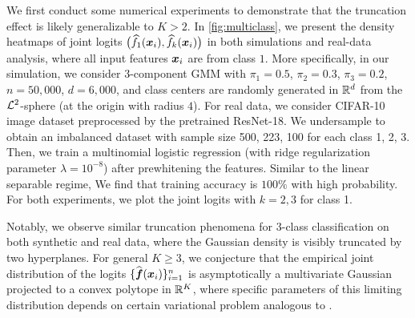 
We first conduct some numerical experiments to demonstrate that the truncation effect is likely generalizable to $K > 2$. In \cref{fig:multiclass}, we present the density heatmaps of joint logits $\bigl(\widehat f_{1}(\text{\boldmath $x$}_i), \widehat f_{k}(\text{\boldmath $x$}_i)\bigr)$ in both simulations and real-data analysis, where all input features $\text{\boldmath $x$}_i$ are from class $1$. More specifically, in our simulation, we consider 3-component GMM with $\pi_1 = 0.5$, $\pi_2 = 0.3$, $\pi_3 = 0.2$, $n=50,000$, $d=6,000$, and class centers are randomly generated in $\mathbb{R}^d$ from the $\mathcal{L}^2$-sphere (at the origin with radius $4$). 
For real data, we consider CIFAR-10 image dataset preprocessed by the pretrained ResNet-18. We undersample to obtain an imbalanced dataset with sample size 500, 223, 100 for each class 1, 2, 3. 
Then, we train a multinomial logistic regression (with ridge regularization parameter $\lambda = 10^{-8}$) after prewhitening the features. Similar to the linear separable regime, We find that training accuracy is $100\%$ with high probability. For both experiments, we plot the joint logits with $k = 2, 3$ for class 1. 

Notably, we observe similar truncation phenomena for $3$-class classification on both synthetic and real data, where the Gaussian density is visibly truncated by two hyperplanes.
For general $K \ge 3$, we conjecture that the empirical joint distribution of the logits $\{ \widehat{{\boldsymbol{f}}}(\text{\boldmath $x$}_i) \}_{i=1}^n$ is asymptotically a multivariate Gaussian projected to a convex polytope in $\mathbb{R}^K$, where specific parameters of this limiting distribution depends on certain variational problem analogous to .





